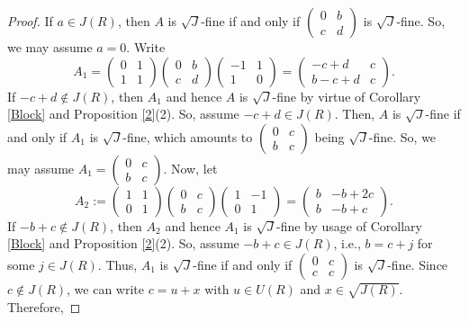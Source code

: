 \documentclass[10pt,a4paper]{amsart}
\begin{document}
\begin{proof}
If \( a \in J(R) \), then \( A \) is $\sqrt{J}$-fine if and only if \( \begin{pmatrix} 0 & b \\ c & d \end{pmatrix} \) is $\sqrt{J}$-fine. So, we may assume \( a = 0 \).
Write
	\[
	A_1 = \begin{pmatrix} 0 & 1 \\ 1 & 1 \end{pmatrix} \begin{pmatrix} 0 & b \\ c & d \end{pmatrix} \begin{pmatrix} -1 & 1 \\ 1 & 0 \end{pmatrix}
	= \begin{pmatrix} -c+d & c \\ b-c+d & c \end{pmatrix}.
	\]
If \( -c+d \not\in J(R) \), then \( A_1 \) and hence \( A \) is $\sqrt{J}$-fine by virtue of Corollary \ref{Block} and Proposition \ref{2}(2). So, assume \( -c+d \in J(R) \). Then, \( A \) is $\sqrt{J}$-fine if and only if \( A_1 \) is $\sqrt{J}$-fine, which amounts to \( \begin{pmatrix} 0 & c \\ b & c \end{pmatrix} \) being $\sqrt{J}$-fine. So, we may assume
$
	A_1 = \begin{pmatrix} 0 & c \\ b & c \end{pmatrix}.
$
Now, let
	\[
	A_2 := \begin{pmatrix} 1 & 1 \\ 0 & 1 \end{pmatrix} \begin{pmatrix} 0 & c \\ b & c \end{pmatrix} \begin{pmatrix} 1 & -1 \\ 0 & 1 \end{pmatrix}
	= \begin{pmatrix} b & -b+2c \\ b & -b+c \end{pmatrix}.
	\]
If \( -b+c \not\in J(R) \), then \( A_2 \) and hence \( A_1 \) is $\sqrt{J}$-fine by usage of Corollary \ref{Block} and Proposition \ref{2}(2). So, assume \( -b+c \in J(R) \), i.e., \( b = c + j \) for some \( j \in J(R) \). Thus, \( A_1 \) is $\sqrt{J}$-fine if and only if \( \begin{pmatrix} 0 & c \\ c & c \end{pmatrix} \) is $\sqrt{J}$-fine. Since \( c \not\in J(R) \), we can write \( c = u + x \) with \( u \in U(R) \) and \( x \in \sqrt{J(R)} \). Therefore,

\end{proof}
\end{document}
